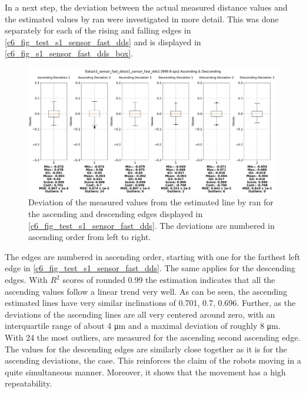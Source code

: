 In a next step, the deviation between the actual measured distance values and the estimated values by \gls{ran} were investigated in more detail. This was done separately for each of the rising and falling edges in \autoref{c6_fig_test_s1_sensor_fast_dds} and is displayed in \autoref{c6_fig_s1_sensor_fast_dds_box}.
\begin{figure}[htbp]
	\centering
	\includegraphics[width=1\textwidth]{Figures/c6/s1/s1_sensor_fast_dds_1_box_aio.pdf}
	\caption{Deviation of the measured values from the estimated line by \gls{ran} for the ascending and descending edges displayed in \autoref{c6_fig_test_s1_sensor_fast_dds}. The deviations are numbered in ascending order from left to right.}
	\label{c6_fig_s1_sensor_fast_dds_box}
\end{figure}
The edges are numbered in ascending order, starting with one for the farthest left edge in \autoref{c6_fig_test_s1_sensor_fast_dds}. The same applies for the descending edges. With $R^2$ scores of rounded 0.99 the estimation indicates that all the ascending values follow a linear trend very well. As can be seen, the ascending estimated lines have very similar inclinations of 0.701, 0.7, 0.696. Further, as the deviations of the ascending lines are all very centered around zero, with an interquartile range of about 4 \si{\micro\meter} and a maximal deviation of roughly 8 \si{\micro\meter}. With 24 the most outliers, are measured for the ascending second ascending edge. The values for the descending edges are similarly close together as it is for the ascending deviations, the case. This reinforces the claim of the robots moving in a quite simultaneous manner. Moreover, it shows that the movement has a high repeatability.
